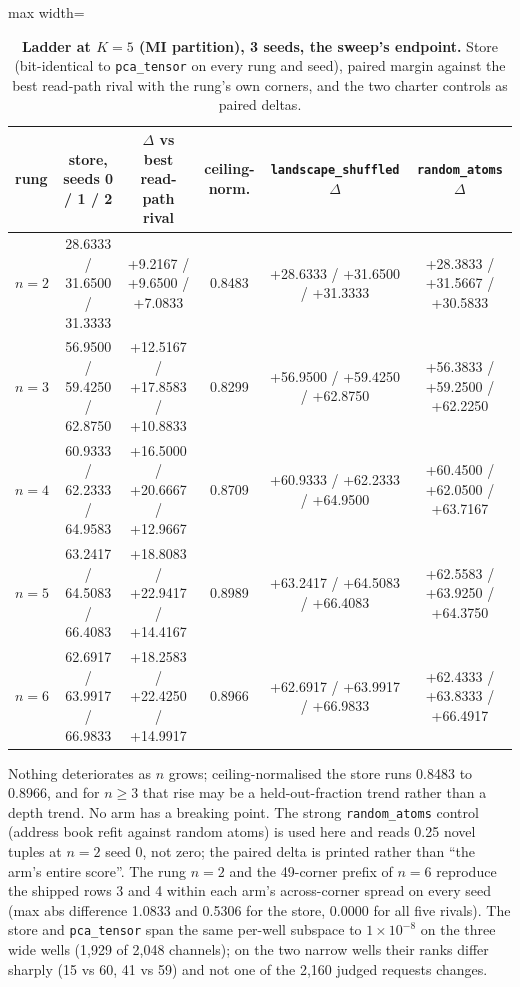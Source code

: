 \documentclass{article}
\newcommand{\sci}[2]{\ensuremath{#1\times10^{#2}}}
\begin{document}
\begin{table}[h]
\centering\small
\caption{\textbf{Ladder at $K=5$ (MI partition), 3 seeds, the sweep's endpoint.} Store
(bit-identical to \texttt{pca\_tensor} on every rung and seed), paired margin against the best
read-path rival with the rung's own corners, and the two charter controls as paired deltas.}
\label{tab:k5}
\setlength{\tabcolsep}{2.4pt}
\begin{adjustbox}{max width=\linewidth}\begin{tabular}{lccccc}
\toprule
rung & store, seeds 0 / 1 / 2 & $\Delta$ vs best read-path rival & ceiling-norm. & \texttt{landscape\_shuffled} $\Delta$ & \texttt{random\_atoms} $\Delta$ \\
\midrule
$n=2$ & 28.6333 / 31.6500 / 31.3333 & +9.2167 / +9.6500 / +7.0833 & 0.8483 & +28.6333 / +31.6500 / +31.3333 & +28.3833 / +31.5667 / +30.5833 \\
$n=3$ & 56.9500 / 59.4250 / 62.8750 & +12.5167 / +17.8583 / +10.8833 & 0.8299 & +56.9500 / +59.4250 / +62.8750 & +56.3833 / +59.2500 / +62.2250 \\
$n=4$ & 60.9333 / 62.2333 / 64.9583 & +16.5000 / +20.6667 / +12.9667 & 0.8709 & +60.9333 / +62.2333 / +64.9500 & +60.4500 / +62.0500 / +63.7167 \\
$n=5$ & 63.2417 / 64.5083 / 66.4083 & +18.8083 / +22.9417 / +14.4167 & 0.8989 & +63.2417 / +64.5083 / +66.4083 & +62.5583 / +63.9250 / +64.3750 \\
$n=6$ & 62.6917 / 63.9917 / 66.9833 & +18.2583 / +22.4250 / +14.9917 & 0.8966 & +62.6917 / +63.9917 / +66.9833 & +62.4333 / +63.8333 / +66.4917 \\
\bottomrule
\end{tabular}\end{adjustbox}
\end{table}

\noindent Nothing deteriorates as $n$ grows; ceiling-normalised the store runs 0.8483 to 0.8966,
and for $n\ge3$ that rise may be a held-out-fraction trend rather than a depth trend. No arm has a
breaking point. The strong \texttt{random\_atoms} control (address book refit against random
atoms) is used here and reads 0.25 novel tuples at $n=2$ seed 0, not zero; the paired delta is
printed rather than ``the arm's entire score''.
The rung $n=2$ and the 49-corner prefix of $n=6$ reproduce the shipped rows 3 and 4 within each
arm's across-corner spread on every seed (max abs difference 1.0833 and 0.5306 for the store, 0.0000
for all five rivals).
The store and \texttt{pca\_tensor} span the same per-well subspace to \sci{1}{-8} on the three wide
wells (1,929 of 2,048 channels); on the two narrow wells their ranks differ sharply (15 vs 60, 41 vs
59) and not one of the 2,160 judged requests changes.
\end{document}
